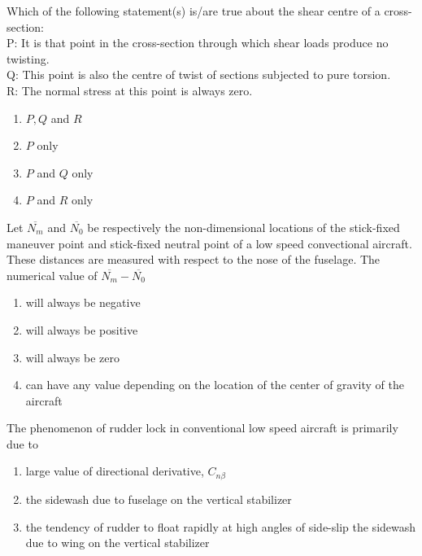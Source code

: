 \item Which of the following statement(s) is/are true about the shear centre of a cross-section:\\
	P: It is that point in the cross-section through which shear loads produce no twisting.\\
	Q: This point is also the centre of twist of sections subjected to pure torsion.\\
	R: The normal stress at this point is always zero.\\
	\begin{enumerate}
		\item $P,Q$ and $R$
		\item $P$ only
		\item $P$ and $Q$ only
		\item $P$ and $R$ only
	\end{enumerate}

\item Let $\overline{N_m}$ and $\overline{N_0}$ be respectively the non-dimensional locations of the stick-fixed maneuver point and stick-fixed neutral point of a low speed convectional aircraft. These distances are measured with respect to the nose of the fuselage. The numerical value of $\overline{N_m}-\overline{N_0}$
	\begin{enumerate}
		\item will always be negative
		\item will always be positive
		\item will always be zero
		\item can have any value depending on the location of the center of gravity of the aircraft
	\end{enumerate}
\item The phenomenon of rudder lock in conventional low speed aircraft is primarily due to 
	\begin{enumerate}
		\item large value of directional derivative, $C_{n\beta}$
		\item the sidewash due to fuselage on the vertical stabilizer
		\item the tendency of rudder to float rapidly at high angles of side-slip the sidewash due to wing on the vertical stabilizer 
	\end{enumerate}


